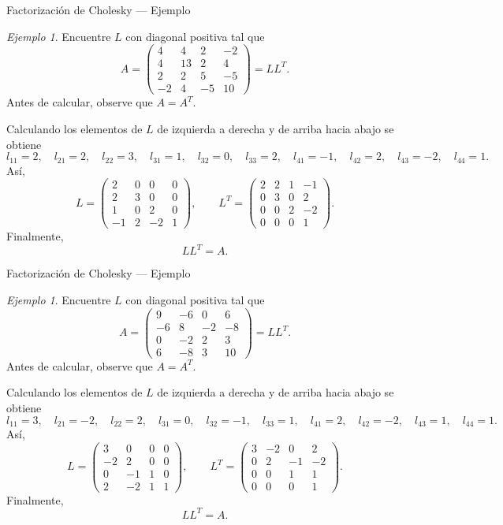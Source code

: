 \documentclass[aspectratio=169,11pt]{beamer}
\theoremstyle{remark}
\newtheorem{Ejem}[definicion]{Ejemplo}
\begin{document}
\begin{frame}[shrink=5]{Factorización de Cholesky — Ejemplo}
\footnotesize
\begin{Ejem}

Encuentre $L$ con diagonal positiva tal que
\[
A=\begin{pmatrix}4 & 4 & 2 & -2\\4 & 13 & 2 & 4\\2 & 2 & 5 & -5\\-2 & 4 & -5 & 10\end{pmatrix}=LL^T.
\]
Antes de calcular, observe que $A=A^T$.

Calculando los elementos de $L$ de izquierda a derecha y de arriba hacia abajo se obtiene
\[
l_{11}=2,\quad l_{21}=2,\quad l_{22}=3,\quad l_{31}=1,\quad l_{32}=0,\quad l_{33}=2,\quad l_{41}=-1,\quad l_{42}=2,\quad l_{43}=-2,\quad l_{44}=1.
\]
Así,
\[
L=\begin{pmatrix}2 & 0 & 0 & 0\\2 & 3 & 0 & 0\\1 & 0 & 2 & 0\\-1 & 2 & -2 & 1\end{pmatrix},\qquad L^T=\begin{pmatrix}2 & 2 & 1 & -1\\0 & 3 & 0 & 2\\0 & 0 & 2 & -2\\0 & 0 & 0 & 1\end{pmatrix}.
\]
Finalmente,
\[
\boxed{LL^T=A}.
\]

\end{Ejem}
\end{frame}

\begin{frame}[shrink=5]{Factorización de Cholesky — Ejemplo}
\footnotesize
\begin{Ejem}
Encuentre $L$ con diagonal positiva tal que
\[
A=\begin{pmatrix}9 & -6 & 0 & 6\\-6 & 8 & -2 & -8\\0 & -2 & 2 & 3\\6 & -8 & 3 & 10\end{pmatrix}=LL^T.
\]
Antes de calcular, observe que $A=A^T$.

Calculando los elementos de $L$ de izquierda a derecha y de arriba hacia abajo se obtiene
\[
l_{11}=3,\quad l_{21}=-2,\quad l_{22}=2,\quad l_{31}=0,\quad l_{32}=-1,\quad l_{33}=1,\quad l_{41}=2,\quad l_{42}=-2,\quad l_{43}=1,\quad l_{44}=1.
\]
Así,
\[
L=\begin{pmatrix}3 & 0 & 0 & 0\\-2 & 2 & 0 & 0\\0 & -1 & 1 & 0\\2 & -2 & 1 & 1\end{pmatrix},\qquad L^T=\begin{pmatrix}3 & -2 & 0 & 2\\0 & 2 & -1 & -2\\0 & 0 & 1 & 1\\0 & 0 & 0 & 1\end{pmatrix}.
\]
Finalmente,
\[
\boxed{LL^T=A}.
\]

\end{Ejem}
\end{frame}
\end{document}
